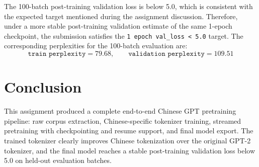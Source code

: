 \documentclass[11pt]{article}
\begin{document}
The 100-batch post-training validation loss is below 5.0, which is consistent with the expected target mentioned during the assignment discussion. Therefore, under a more stable post-training validation estimate of the same 1-epoch checkpoint, the submission satisfies the \texttt{1 epoch val\_loss < 5.0} target. The corresponding perplexities for the 100-batch evaluation are:
\[
\texttt{train perplexity} = 79.68,\qquad
\texttt{validation perplexity} = 109.51
\]

\section{Conclusion}
This assignment produced a complete end-to-end Chinese GPT pretraining pipeline: raw corpus extraction, Chinese-specific tokenizer training, streamed pretraining with checkpointing and resume support, and final model export. The trained tokenizer clearly improves Chinese tokenization over the original GPT-2 tokenizer, and the final model reaches a stable post-training validation loss below 5.0 on held-out evaluation batches.
\end{document}
